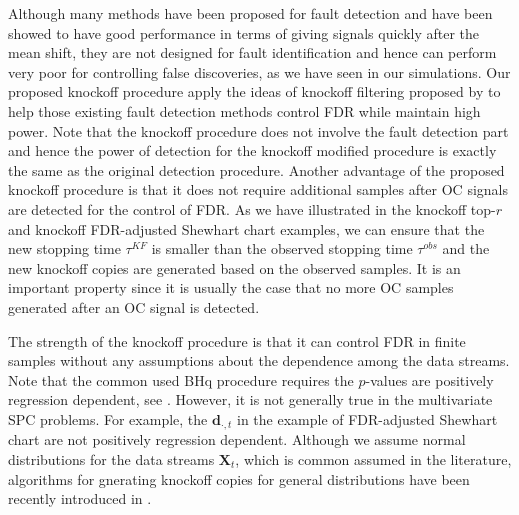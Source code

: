 \documentclass[a4paper,12pt]{article}
\begin{document}
Although many methods have been proposed for fault detection and have been showed to have good performance in terms of giving signals quickly after the mean shift, they are not designed for fault identification and hence can perform very poor for controlling false discoveries, as we have seen in our simulations. Our proposed knockoff procedure apply the ideas of knockoff filtering proposed by \cite{barber2015controlling} to help those existing fault detection methods control FDR while maintain high power. Note that the knockoff procedure does not involve the fault detection part and hence the power of detection for the knockoff modified procedure is exactly the same as the original detection procedure. Another advantage of the proposed knockoff procedure is that it does not require additional samples after OC signals are detected for the control of FDR. As we have illustrated in the knockoff top-$r$ and knockoff FDR-adjusted Shewhart chart examples, we can ensure that the new stopping time $\tau^{KF}$ is smaller than the observed stopping time $\tau^{obs}$ and the new knockoff copies are generated based on the observed samples. It is an important property since it is usually the case that no more OC samples generated after an OC signal is detected.

The strength of the knockoff procedure is that it can control FDR in finite samples without any assumptions about the dependence among the data streams. Note that the common used BHq procedure requires the $p$-values are positively regression dependent, see \cite{benjamini2006adaptive}. However, it is not generally true in the multivariate SPC problems. For example, the $\mathbf{d}_{\cdot,t}$ in the  
example of FDR-adjusted Shewhart chart are not positively regression dependent. Although we assume normal distributions for the data streams $\mathbf{X}_t$, which is common assumed in the literature, algorithms for gnerating knockoff copies for general distributions have been recently introduced in \cite{BatesEtAl2020}.









\appendix
\setcounter{equation}{0} 
\renewcommand{\theequation}{A\arabic{equation}}
\end{document}
